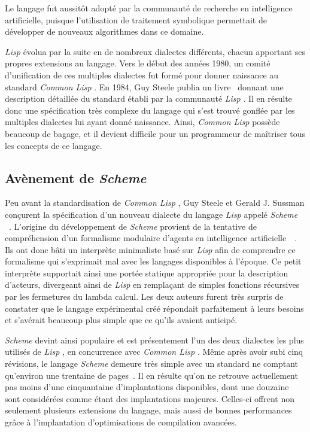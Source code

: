 \documentclass[12pt,twoside,letterpaper,francais]{book}
\newcommand{\lisp}{{\textit{Lisp }}}
\newcommand{\clisp}{{\textit{Common Lisp }}}
\newcommand{\Schemelang}{{\textit{Scheme }}}
\begin{document}
Le langage fut aussitôt adopté par la communauté de recherche en
intelligence artificielle, puisque l'utilisation de traitement
symbolique permettait de développer de nouveaux algorithmes dans ce
domaine.

\lisp évolua par la suite en de nombreux dialectes différents, chacun
apportant ses propres extensions au langage. Vers le début des années
1980, un comité d'unification de ces multiples dialectes fut formé
pour donner naissance au standard \clisp. En 1984, Guy Steele publia
un livre~\cite{CLISP} donnant une description détaillée du standard
établi par la communauté \lisp. Il en résulte donc une spécification
très complexe du langage qui s'est trouvé gonflée par les multiples
dialectes lui ayant donné naissance. Ainsi, \clisp possède beaucoup de
bagage, et il devient difficile pour un programmeur de maîtriser tous
les concepts de ce langage.


\FloatBarrier
\subsection{Avènement de \Schemelang}
Peu avant la standardisation de \clisp, Guy Steele et Gerald
J. Sussman conçurent la spécification d'un nouveau dialecte du langage
\lisp appelé \Schemelang~\cite{SCHEME_ORIGINS}. L'origine du
développement de \Schemelang provient de la tentative de compréhension
d'un formalisme modulaire d'agents en intelligence
artificielle~\cite{ACTOR}~\cite{Scheme-History}. Ils ont donc bâti un
interprète minimaliste basé sur \lisp afin de comprendre ce formalisme
qui s'exprimait mal avec les langages disponibles à l'époque. Ce petit
interprète supportait ainsi une portée statique appropriée pour la
description d'acteurs, divergeant ainsi de \lisp en remplaçant de
simples fonctions récursives par les fermetures du lambda calcul. Les
deux auteurs furent très surpris de constater que le langage
expérimental créé répondait parfaitement à leurs besoins et s'avérait
beaucoup plus simple que ce qu'ils avaient anticipé.

\Schemelang devint ainsi populaire et est présentement l'un des deux
dialectes les plus utilisés de \lisp, en concurrence avec \clisp. Même
après avoir subi cinq révisions, le langage \Schemelang demeure très
simple avec un standard ne comptant qu'environ une trentaine de
pages~\cite{R5RS}. Il en résulte qu'on ne retrouve actuellement pas
moins d'une cinquantaine d'implantations disponibles, dont une
douzaine sont considérées comme étant des implantations
majeures. Celles-ci offrent non seulement plusieurs extensions du
langage, mais aussi de bonnes performances grâce à l'implantation
d'optimisations de compilation avancées.
\end{document}
